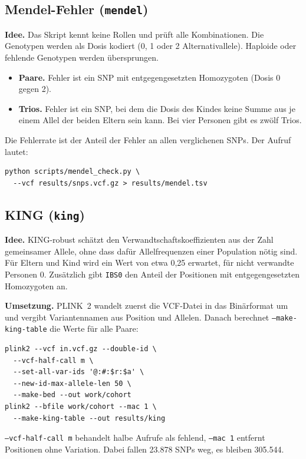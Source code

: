 \documentclass[10pt,a4paper,twocolumn]{article}
\begin{document}
\subsection{Mendel-Fehler (\texttt{mendel})}
\textbf{Idee.} Das Skript  kennt keine Rollen und prüft alle Kombinationen. Die Genotypen werden als Dosis kodiert (0, 1 oder 2 Alternativallele). Haploide oder fehlende Genotypen werden übersprungen.
\begin{itemize}
  \item \textbf{Paare.} Fehler ist ein SNP mit entgegengesetzten Homozygoten (Dosis 0 gegen 2).
  \item \textbf{Trios.} Fehler ist ein SNP, bei dem die Dosis des Kindes keine Summe aus je einem Allel der beiden Eltern sein kann. Bei vier Personen gibt es zwölf Trios.
\end{itemize}
Die Fehlerrate ist der Anteil der Fehler an allen verglichenen SNPs. Der Aufruf lautet:
\begin{lstlisting}
python scripts/mendel_check.py \
  --vcf results/snps.vcf.gz > results/mendel.tsv
\end{lstlisting}

\subsection{KING (\texttt{king})}
\textbf{Idee.} KING-robust \citep{manichaikul2010} schätzt den Verwandtschaftskoeffizienten aus der Zahl gemeinsamer Allele, ohne dass dafür Allelfrequenzen einer Population nötig sind. Für Eltern und Kind wird ein Wert von etwa 0,25 erwartet, für nicht verwandte Personen 0. Zusätzlich gibt \texttt{IBS0} den Anteil der Positionen mit entgegengesetzten Homozygoten an.

\textbf{Umsetzung.} PLINK~2 \citep{chang2015} wandelt zuerst die VCF-Datei in das Binärformat um und vergibt Variantennamen aus Position und Allelen. Danach berechnet \texttt{--make-king-table} die Werte für alle Paare:
\begin{lstlisting}
plink2 --vcf in.vcf.gz --double-id \
  --vcf-half-call m \
  --set-all-var-ids '@:#:$r:$a' \
  --new-id-max-allele-len 50 \
  --make-bed --out work/cohort
plink2 --bfile work/cohort --mac 1 \
  --make-king-table --out results/king
\end{lstlisting}
\texttt{--vcf-half-call m} behandelt halbe Aufrufe als fehlend, \texttt{--mac 1} entfernt Positionen ohne Variation. Dabei fallen 23.878 SNPs weg, es bleiben 305.544.

\end{document}
